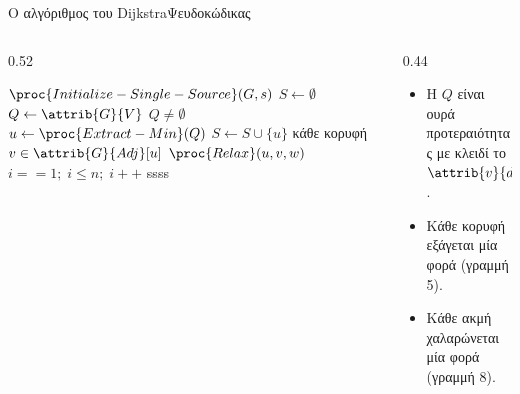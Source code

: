\documentclass[t,aspectratio=169,9pt]{beamer}
\begin{document}
\begin{frame}{Ο αλγόριθμος του Dijkstra}{Ψευδοκώδικας}
  \begin{columns}[T]
    \begin{column}{0.52\textwidth}
      \begin{pseudo}
        \li $\proc{Initialize-Single-Source}(G, s)$
        \li $S \gets \emptyset$
        \li $Q \gets \attrib{G}{V}$
        \li \While $Q \neq \emptyset$
        \li   \Do
                $u \gets \proc{Extract-Min}(Q)$
        \li     $S \gets S \cup \{u\}$
        \li     \For κάθε κορυφή $v \in \attrib{G}{Adj}[u]$
        \li       \Do
                    $\proc{Relax}(u, v, w)$ 
                  \End
              \End
        \li   \For $i == 1; \; i \leq n; \; i++$
        \li     \Do
        \li ssss
              \End
      \end{pseudo}
    \end{column}
    \begin{column}{0.44\textwidth}
      \pause
      \begin{itemize}
        \item Η $Q$ είναι ουρά προτεραιότητας με κλειδί το $\attrib{v}{d}$.
        \pause
        \item Κάθε κορυφή εξάγεται μία φορά (γραμμή 5).
        \pause
        \item Κάθε ακμή χαλαρώνεται μία φορά (γραμμή 8).
      \end{itemize}
    \end{column}
  \end{columns}
\end{frame}
\end{document}

